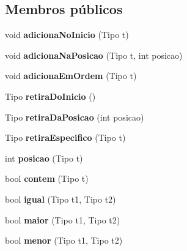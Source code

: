 \subsection*{Membros públicos}
\begin{DoxyCompactItemize}
\item 
\hypertarget{classLista_a158ab14d926b6a881e92f8a98c52ca0c}{void {\bfseries adiciona\-No\-Inicio} (Tipo t)}\label{classLista_a158ab14d926b6a881e92f8a98c52ca0c}

\item 
\hypertarget{classLista_a21853f382bab3540ab6dfeece9fe3ba1}{void {\bfseries adiciona\-Na\-Posicao} (Tipo t, int posicao)}\label{classLista_a21853f382bab3540ab6dfeece9fe3ba1}

\item 
\hypertarget{classLista_a9c9a9ac8cbf7e849b2e470c3be5926a2}{void {\bfseries adiciona\-Em\-Ordem} (Tipo t)}\label{classLista_a9c9a9ac8cbf7e849b2e470c3be5926a2}

\item 
\hypertarget{classLista_a17f714047bc94715e5b77d5a98e3ef55}{Tipo {\bfseries retira\-Do\-Inicio} ()}\label{classLista_a17f714047bc94715e5b77d5a98e3ef55}

\item 
\hypertarget{classLista_a554cfbab02c678a9186ffb3d80079e97}{Tipo {\bfseries retira\-Da\-Posicao} (int posicao)}\label{classLista_a554cfbab02c678a9186ffb3d80079e97}

\item 
\hypertarget{classLista_aff23d54db73f06e457eba73b886fd84f}{Tipo {\bfseries retira\-Especifico} (Tipo t)}\label{classLista_aff23d54db73f06e457eba73b886fd84f}

\item 
\hypertarget{classLista_ad374d77a408c513004c79cd33ddc76a3}{int {\bfseries posicao} (Tipo t)}\label{classLista_ad374d77a408c513004c79cd33ddc76a3}

\item 
\hypertarget{classLista_a3dcad88a266c9d487e149c366f7e8d05}{bool {\bfseries contem} (Tipo t)}\label{classLista_a3dcad88a266c9d487e149c366f7e8d05}

\item 
\hypertarget{classLista_a2ffbcb916698dba55a97290ff91be666}{bool {\bfseries igual} (Tipo t1, Tipo t2)}\label{classLista_a2ffbcb916698dba55a97290ff91be666}

\item 
\hypertarget{classLista_a9b265cf31415874bd52170d3ae4abe29}{bool {\bfseries maior} (Tipo t1, Tipo t2)}\label{classLista_a9b265cf31415874bd52170d3ae4abe29}

\item 
\hypertarget{classLista_a4b879b1914f3bf9bc76570a50749aafc}{bool {\bfseries menor} (Tipo t1, Tipo t2)}\label{classLista_a4b879b1914f3bf9bc76570a50749aafc}

\end{DoxyCompactItemize}
